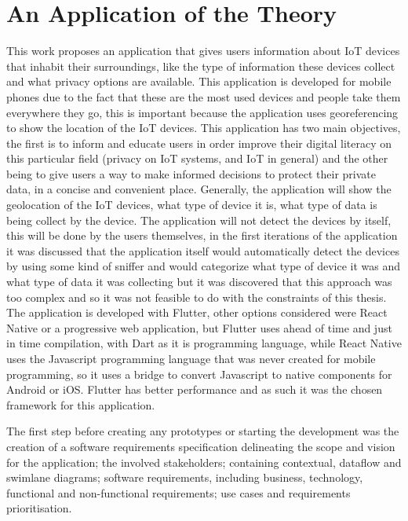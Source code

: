 %
%
\section{An Application of the Theory}
\label{section:stage2}

This work proposes an application that gives users information about IoT
devices that inhabit their surroundings, like the type of information these devices
collect and what privacy options are available. This application is developed
for mobile phones due to the fact that these are the most used devices
and people take them everywhere they go, this is important because the application
uses georeferencing to show the location of the IoT devices. This application
has two main objectives, the first is to inform and educate users in order improve
their digital literacy on this particular field (privacy on IoT systems, and
IoT in general) and the other being to give users a way to make informed decisions
to protect their private data, in a concise and convenient place. Generally,
the application will show the geolocation of the IoT devices, what type of
device it is, what type of data is being collect by the device. The application
will not detect the devices by itself, this will be done by the users themselves,
in the first iterations of the application it was discussed that the application
itself would automatically detect the devices by using some kind of sniffer
and would categorize what type of device it was and what type of data it
was collecting but it was discovered that this approach was too complex and
so it was not feasible to do with the constraints of this thesis. The application
is developed with Flutter, other options considered were React Native or a
progressive web application, but Flutter uses ahead of time and just in time
compilation, with Dart as it is programming language, while React Native uses
the Javascript programming language that was never created for mobile programming,
so it uses a bridge to convert Javascript to native components for Android
or iOS. Flutter has better performance and as such it was the chosen framework
for this application.

The first step before creating any prototypes or starting the development was
the creation of a software requirements specification
delineating the scope and vision for the application; the involved stakeholders;
containing contextual, dataflow and swimlane diagrams; software requirements, including
business, technology, functional and non-functional requirements; use cases
and requirements prioritisation.

